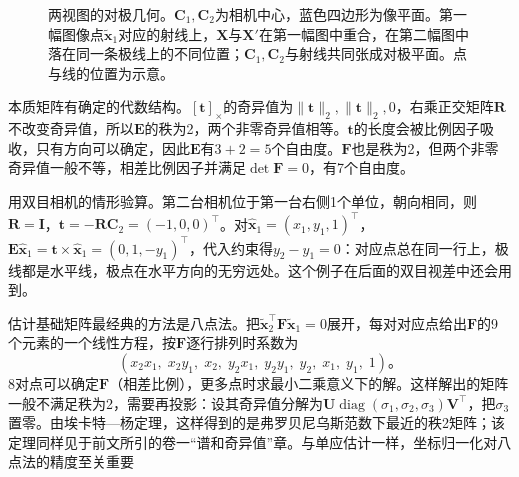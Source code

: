 \begin{figure}[htbp]
  \centering
  
  \caption{两视图的对极几何。$\bm C_1,\bm C_2$为相机中心，蓝色四边形为像平面。第一幅图像点$\tilde{\bm x}_1$对应的射线上，$\bm X$与$\bm X'$在第一幅图中重合，在第二幅图中落在同一条极线上的不同位置；$\bm C_1,\bm C_2$与射线共同张成对极平面。点与线的位置为示意。}
  \label{fig:vision-formation-epipolar}
\end{figure}

本质矩阵有确定的代数结构。$[\bm t]_\times$的奇异值为$\lVert\bm t\rVert_2,\lVert\bm t\rVert_2,0$，右乘正交矩阵$\bm R$不改变奇异值，所以$\bm E$的秩为2，两个非零奇异值相等。$\bm t$的长度会被比例因子吸收，只有方向可以确定，因此$\bm E$有$3+2=5$个自由度。$\bm F$也是秩为2，但两个非零奇异值一般不等，相差比例因子并满足$\det\bm F=0$，有7个自由度。

用双目相机的情形验算。第二台相机位于第一台右侧1个单位，朝向相同，则$\bm R=\bm I$，$\bm t=-\bm R\bm C_2=(-1,0,0)^\top$。对$\hat{\bm x}_1=(x_1,y_1,1)^\top$，$\bm E\hat{\bm x}_1=\bm t\times\hat{\bm x}_1=(0,1,-y_1)^\top$，代入约束得$y_2-y_1=0$：对应点总在同一行上，极线都是水平线，极点在水平方向的无穷远处。这个例子在后面的双目视差中还会用到。

估计基础矩阵最经典的方法是八点法。把$\tilde{\bm x}_2^\top\bm F\tilde{\bm x}_1=0$展开，每对对应点给出$\bm F$的9个元素的一个线性方程，按$\bm F$逐行排列时系数为
\[
  (x_2x_1,\;x_2y_1,\;x_2,\;y_2x_1,\;y_2y_1,\;y_2,\;x_1,\;y_1,\;1)\text{。}
\]
8对点可以确定$\bm F$（相差比例），更多点时求最小二乘意义下的解。这样解出的矩阵一般不满足秩为2，需要再投影：设其奇异值分解为$\bm U\operatorname{diag}(\sigma_1,\sigma_2,\sigma_3)\bm V^\top$，把$\sigma_3$置零。由埃卡特—杨定理，这样得到的是弗罗贝尼乌斯范数下最近的秩2矩阵；该定理同样见于前文所引的卷一“谱和奇异值”章。与单应估计一样，坐标归一化对八点法的精度至关重要


